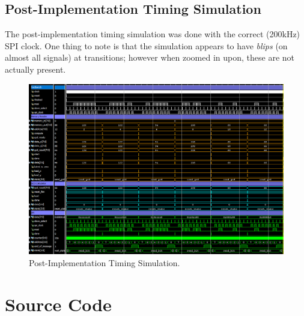 \documentclass[a4paper, 12pt]{article}
\begin{document}
\begin{landscape}
\subsection{Post-Implementation Timing Simulation}
The post-implementation timing simulation was done with the correct (200kHz) SPI clock. One thing to note is that the simulation appears to have \textit{blips} (on almost all signals) at transitions; however when zoomed in upon, these are not actually present.

\begin{figure}[H]
\centering
\includegraphics[width=0.85\paperheight, keepaspectratio=true]{Sources/Post-Impl-All-Signals-Sim.PNG}
\caption{Post-Implementation Timing Simulation.}
\label{fig:post-impl-sim}
\end{figure}

\end{landscape}

\section{Source Code}
\begin{mdframed}[backgroundcolor=code-gray, roundcorner=10pt, innerleftmargin=25, innertopmargin=5, innerbottommargin=5]	

\end{mdframed}

\begin{mdframed}[backgroundcolor=code-gray, roundcorner=10pt, innerleftmargin=25, innertopmargin=5, innerbottommargin=5]	

\end{mdframed}

\begin{mdframed}[backgroundcolor=code-gray, roundcorner=10pt, innerleftmargin=25, innertopmargin=5, innerbottommargin=5]	

\end{mdframed}

\begin{mdframed}[backgroundcolor=code-gray, roundcorner=10pt, innerleftmargin=25, innertopmargin=5, innerbottommargin=5]	

\end{mdframed}
\end{document}

